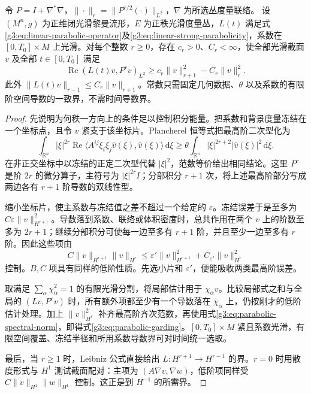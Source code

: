 \begin{lemma}\label{g3:lem:parabolic-garding}
	令 \(P=I+\nabla^*\nabla\)，\(\|\cdot\|_r=\|P^{r/2}(\cdot)\|_{L^2}\)，\(\nabla\) 为所选丛度量联络。
	设 \((M^n,g)\) 为正维闭光滑黎曼流形，\(E\) 为正秩光滑度量丛，\(L(t)\) 满足式\eqref{g3:eq:linear-parabolic-operator}及\eqref{g3:eq:linear-strong-parabolicity}，系数在 \([0,T_0]\times M\) 上光滑。对每个整数 \(r\ge0\)，存在 \(c_r>0\)、\(C_r<\infty\)，使全部光滑截面 \(v\) 及全部 \(t\in[0,T_0]\) 满足
	\begin{equation}\label{g3:eq:parabolic-garding}
		\operatorname{Re}(L(t)v,P^rv)_{L^2}
		\ge c_r\|v\|_{r+1}^2-C_r\|v\|_r^2.
	\end{equation}
	此外 \(\|L(t)v\|_{r-1}\le C_r\|v\|_{r+1}\)。常数只需固定几何数据、\(\theta\) 以及系数的有限阶空间导数的一致界，不需时间导数界。
\end{lemma}
\begin{proof}
	先说明为何秩一方向上的条件足以控制积分能量。把系数和背景度量冻结在一个坐标点，且令 \(v\) 紧支于该坐标片。Plancherel 恒等式把最高阶二次型化为
	\[
		\int_{\mathbb R^n}|\xi|^{2r}
		\operatorname{Re}\langle A^{ij}\xi_i\xi_j\widehat v(\xi),\widehat v(\xi)\rangle\,\mathrm d\xi
		\ge\theta\int_{\mathbb R^n}|\xi|^{2r+2}|\widehat v(\xi)|^2\,\mathrm d\xi.
	\]
	在非正交坐标中以冻结的正定二次型代替 \(|\xi|^2\)，范数等价给出相同结论。这里 \(P^r\) 是阶 \(2r\) 的微分算子，主符号为 \(|\xi|^{2r}I\)；分部积分 \(r+1\) 次，将上述最高阶部分写成两边各有 \(r+1\) 阶导数的双线性型。

	缩小坐标片，使主系数与冻结值之差不超过一个给定的 \(\varepsilon\)。冻结误差于是至多为 \(C\varepsilon\|v\|_{H^{r+1}}^2\)。导数落到系数、联络或体积密度时，总共作用在两个 \(v\) 上的阶数至多为 \(2r+1\)；继续分部积分可使每一边至多有 \(r+1\) 阶，并且至少一边至多有 \(r\) 阶。因此这些项由
	\[
		C\|v\|_{H^{r+1}}\|v\|_{H^r}
		\le\varepsilon'\|v\|_{H^{r+1}}^2+C_{\varepsilon'}\|v\|_{H^r}^2
	\]
	控制。\(B,C\) 项具有同样的低阶性质。先选小片和 \(\varepsilon'\)，便能吸收两类最高阶误差。

	取满足 \(\sum_\alpha\chi_\alpha^2=1\) 的有限光滑分割，将局部估计用于 \(\chi_\alpha v\)。比较局部式之和与全局的 \((Lv,P^rv)\) 时，所有额外项都至少有一个导数落在 \(\chi_\alpha\) 上，仍按刚才的低阶估计处理。加上 \(\|v\|_{H^r}^2\) 补齐最高阶齐次范数，再使用式\eqref{g3:eq:parabolic-spectral-norm}，即得式\eqref{g3:eq:parabolic-garding}。\([0,T_0]\times M\) 紧且系数光滑，有限空间覆盖、冻结半径和所用系数导数界可对时间统一选取。

	最后，当 \(r\ge1\) 时，Leibniz 公式直接给出 \(L:H^{r+1}\to H^{r-1}\) 的界。\(r=0\) 时用散度形式与 \(H^1\) 测试截面配对：主项为 \((A\nabla v,\nabla w)\)，低阶项同样受 \(C\|v\|_{H^1}\|w\|_{H^1}\) 控制。这正是到 \(H^{-1}\) 的所需界。
\end{proof}

